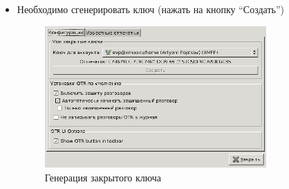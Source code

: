 \documentclass[presentation]{beamer}
\begin{document}
\begin{frame}{}
\begin{itemize}
\item Необходимо сгенерировать ключ (нажать на кнопку ``Создать'')
    \begin{figure}[htb]
    \centering
    \includegraphics[clip,width=0.8\textwidth]{./pidgin-otr-3.png}
    \caption{Генерация закрытого ключа}
    \end{figure}
\end{itemize}
\end{frame}
\end{document}
